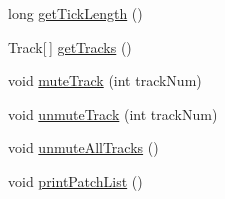 \begin{DoxyCompactItemize}
\item 
long \hyperlink{classcom_1_1lclion_1_1midiplayer_1_1_m_i_d_i_player_a318c504fc464b620e829b6ed354cc922}{get\+Tick\+Length} ()
\item 
Track\mbox{[}$\,$\mbox{]} \hyperlink{classcom_1_1lclion_1_1midiplayer_1_1_m_i_d_i_player_a9c00c1196a6593faccf3e71ee4ba7c84}{get\+Tracks} ()
\item 
void \hyperlink{classcom_1_1lclion_1_1midiplayer_1_1_m_i_d_i_player_a5ea586ca69152e093de72efaa30035ab}{mute\+Track} (int track\+Num)
\item 
void \hyperlink{classcom_1_1lclion_1_1midiplayer_1_1_m_i_d_i_player_a273586a96562827374d3167a6f844bf1}{unmute\+Track} (int track\+Num)
\item 
void \hyperlink{classcom_1_1lclion_1_1midiplayer_1_1_m_i_d_i_player_a32f4912c0d576586a49ecce3a41709e8}{unmute\+All\+Tracks} ()
\item 
void \hyperlink{classcom_1_1lclion_1_1midiplayer_1_1_m_i_d_i_player_a6b4104bceabf350464cc74e4d9babcb1}{print\+Patch\+List} ()
\end{DoxyCompactItemize}
